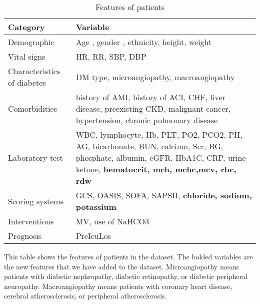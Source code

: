 \documentclass[../main.tex]{subfiles}
\begin{document}
\begin{table}[h]
\centering
\caption{Features of patients}
\begin{tabular}{|l|p{}|}
    \hline
    \textbf{Category} & \textbf{Variable} \\
    \hline

    Demographic & 
    Age , gender , ethnicity, height, weight \\
    \hline

    Vital signs & 
    HR, RR, SBP, DBP \\
    \hline

    Characteristics of diabetes &
    DM type, microangiopathy, macroangiopathy \\
    \hline
    
    Comorbidities &
    history of AMI, history of ACI, CHF, liver disease, preexisting-CKD, malignant cancer, hypertension, chronic pulmonary disease \\
    \hline

    Laboratory test &
    WBC, lymphocyte, Hb, PLT, PO2, PCO2, PH, AG, bicarbonate, BUN, calcium, Scr, BG, phosphate, albumin, eGFR, HbA1C, CRP, urine ketone, \textbf{hematocrit, mch, mchc,mcv, rbc, rdw} \\
    \hline

    Scoring systems &
    GCS, OASIS, SOFA, SAPSII, \textbf{chloride, sodium, potassium} \\
    \hline

    Interventions &
    MV, use of NaHCO3 \\
    \hline

    Prognosis &
    PreIcuLos \\
    \hline

\end{tabular}

\end{table}

This table shows the features of patients in the dataset. 
The bolded variables are the new features that we have added to the dataset.
Microangiopathy means patients with diabetic nephropathy, diabetic retinopathy, or diabetic peripheral neuropathy. Macroangiopathy means patients with coronary heart disease, cerebral atherosclerosis, or peripheral atherosclerosis.
\end{document}
